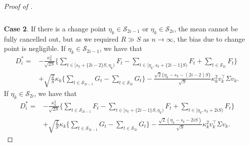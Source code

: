 \documentclass[11pt]{article}
\theoremstyle{plain}
\theoremstyle{definition}
\begin{document}
\begin{proof}[Proof of ]
\begin{align*}
\end{align*}
\
\\
\textbf{Case 2}.
If there is a change point $\eta_k \in \mathcal{S}_{2i-1}$ or $\eta_k \in \mathcal{S}_{2i}$, the mean cannot be fully cancelled out, but as we required $R \gg S$ as $n \to \infty$, the bias due to change point is negligible. If $\eta_k \in \mathcal{S}_{2i-1}$, we have that
\begin{align*}
   D_i^*
   =& -\frac{\kappa_k^2}{\sqrt{2S}}\bigg\{\sum_{t \in [s_k+\{2i-2\}S, \eta_k)}F_t - \sum_{t \in [\eta_k, s_k+\{2i-1\}S)}F_t + \sum_{t \in \mathcal{S}_{2i}}F_t\bigg\}\\
   & +\sqrt{\frac{2}{S}}\kappa_k\bigg\{\sum_{t \in \mathcal{S}_{2i-1}}G_t - \sum_{t \in \mathcal{S}_{2i}}G_t\bigg\} - \frac{\sqrt{2}\{\eta_k - s_k-(2i-2)S\}}{\sqrt{S}}\kappa_k^2v_k^{\top}\Sigma v_k.
\end{align*}
If $\eta_k \in \mathcal{S}_{2i}$, we have that
\begin{align*}
   D_i^* 
   =& -\frac{\kappa_k^2}{\sqrt{2S}}\bigg\{\sum_{t \in \mathcal{S}_{2i-1}}F_t - \sum_{t \in [s_k+\{2i-1\}S, \eta_k)}F_t + \sum_{t \in [\eta_k, s_k+2iS)}F_t\bigg\}\\
   & +\sqrt{\frac{2}{S}}\kappa_k\bigg\{\sum_{t \in \mathcal{S}_{2i-1}}G_t - \sum_{t \in \mathcal{S}_{2i}}G_t\bigg\} - \frac{\sqrt{2}(\eta_k - s_k - 2iS)}{\sqrt{S}}\kappa_k^2v_k^{\top}\Sigma v_k.
\end{align*}


\end{proof}
\end{document}
